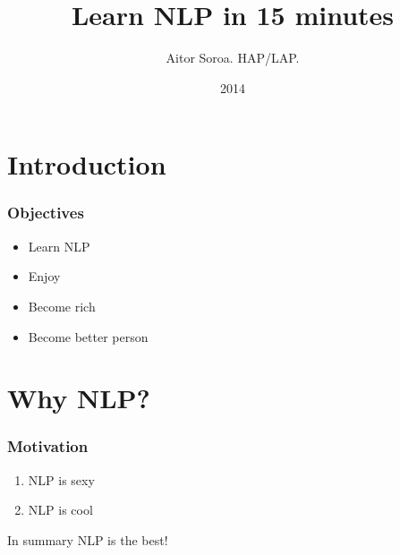 \documentclass{beamer}
\title{Learn NLP in 15 minutes}
\author{Aitor Soroa. HAP/LAP.}
\date{2014}
\begin{document}
\begin{frame}
  \titlepage
\end{frame}

\begin{frame}
  \tableofcontents
\end{frame}

\section{Introduction}
\label{sec:introduction}

\begin{frame}
  \frametitle{Objectives}
  \begin{itemize}
  \item Learn NLP
  \item Enjoy
  \item Become rich
  \item Become better person
  \end{itemize}
\end{frame}

\section{Why NLP?}
\label{sec:why-nlp}

\begin{frame}
  \frametitle{Motivation}
  \begin{enumerate}
  \item NLP is sexy
  \item NLP is cool
  \end{enumerate}
  \begin{block}{In summary}
    NLP is the best!
  \end{block}
\end{frame}
\end{document}
